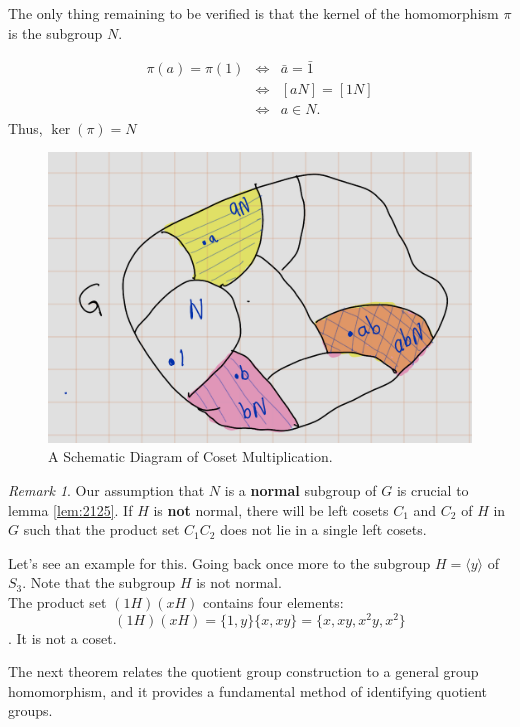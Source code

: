 \documentclass[
]{book}
\theoremstyle{definition}
\theoremstyle{definition}
\theoremstyle{definition}
\theoremstyle{definition}
\theoremstyle{remark}
\newtheorem*{remark}{Remark}
\begin{document}
The only thing remaining to be verified is that the kernel of the homomorphism \(\pi\) is the subgroup \(N\).

\begin{eqnarray}
\pi (a) =\pi(1) &\iff & \bar{a}= \bar{1}\\
& \iff & [aN] = [1N]\\
& \iff & a \in N.
\end{eqnarray}
Thus, \(\ker(\pi)=N\)

\begin{figure}
\centering
\includegraphics{figures/ch_2/fig30.png}
\caption{\label{fig:fig2-30}A Schematic Diagram of Coset Multiplication.}
\end{figure}

\begin{remark}
Our assumption that \(N\) is a \textbf{normal} subgroup of \(G\) is crucial to lemma \ref{lem:2125}. If \(H\) is \textbf{not} normal, there will be left cosets \(C_1\) and \(C_2\) of \(H\) in \(G\) such that the product set \(C_1 C_2\) does not lie in a single left cosets.

Let's see an example for this. Going back once more to the subgroup \(H = \langle y \rangle\) of \(S_3\).
Note that the subgroup \(H\) is not normal.\\
The product set \((1H)(xH)\) contains four elements: \[(1H)(xH)=\{1, y\}\{x, xy\} = \{x, xy, x^2y, x^2\}\]. It is not a coset.
\end{remark}

The next theorem relates the quotient group construction to a general group homomorphism, and it provides a fundamental method of identifying quotient groups.
\end{document}
